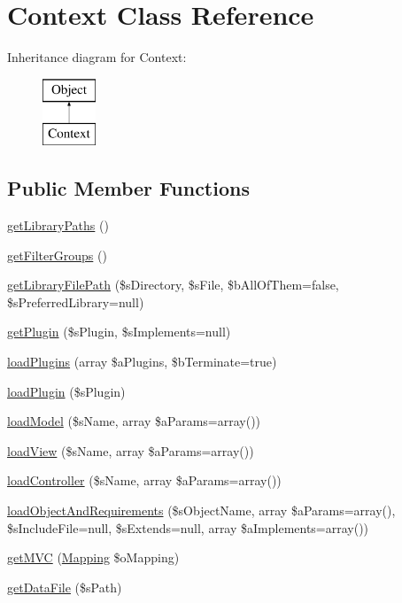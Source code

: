 \hypertarget{class_context}{\section{Context Class Reference}
\label{class_context}
}
Inheritance diagram for Context\-:\begin{figure}[H]
\begin{center}
\leavevmode
\includegraphics[height=2.000000cm]{class_context}
\end{center}
\end{figure}
\subsection*{Public Member Functions}
\begin{DoxyCompactItemize}
\item 
\hyperlink{class_context_a25027250a19c6c7f858fdc6a15ccc6fd}{get\-Library\-Paths} ()
\item 
\hyperlink{class_context_a88b3fae4b81660b705dd86053f15faaf}{get\-Filter\-Groups} ()
\item 
\hyperlink{class_context_af46f99c62638d7ff147a02a5be033762}{get\-Library\-File\-Path} (\$s\-Directory, \$s\-File, \$b\-All\-Of\-Them=false, \$s\-Preferred\-Library=null)
\item 
\hyperlink{class_context_a4a43e37a10bf6fa9f0533331517d8072}{get\-Plugin} (\$s\-Plugin, \$s\-Implements=null)
\item 
\hyperlink{class_context_ab9c91486c1ef629018b9064b8fa2e8c4}{load\-Plugins} (array \$a\-Plugins, \$b\-Terminate=true)
\item 
\hyperlink{class_context_a4842e2aeb71bfa7e01102b5625636784}{load\-Plugin} (\$s\-Plugin)
\item 
\hyperlink{class_context_aa24e565ad92a8b25d966b599cad64fa0}{load\-Model} (\$s\-Name, array \$a\-Params=array())
\item 
\hyperlink{class_context_a93b8171f08dc553101d04295a559d48d}{load\-View} (\$s\-Name, array \$a\-Params=array())
\item 
\hyperlink{class_context_a2f71ab4bef9ba87fa2a43e155d982bfe}{load\-Controller} (\$s\-Name, array \$a\-Params=array())
\item 
\hyperlink{class_context_a4f2a03faa65ed2ce9b5d80aab0b0c4cd}{load\-Object\-And\-Requirements} (\$s\-Object\-Name, array \$a\-Params=array(), \$s\-Include\-File=null, \$s\-Extends=null, array \$a\-Implements=array())
\item 
\hyperlink{class_context_a1ec2325ed7bf9ffc92c28f111b194578}{get\-M\-V\-C} (\hyperlink{class_mapping}{Mapping} \$o\-Mapping)
\item 
\hyperlink{class_context_ae30a1958aa6091697e954ccd45cfc406}{get\-Data\-File} (\$s\-Path)
\end{DoxyCompactItemize}
